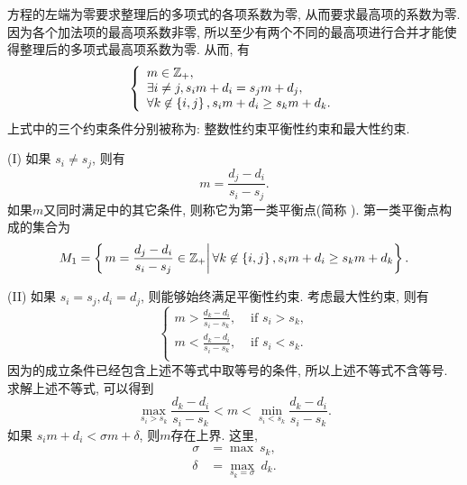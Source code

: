 方程的左端为零要求整理后的多项式的各项系数为零, 从而要求最高项的系数为零. 因为各个加法项的最高项系数非零, 所以至少有两个不同的最高项进行合并才能使得整理后的多项式最高项系数为零. 从而, 有 
\begin{equation}
\left\{
\begin{array}{l}
m\in \mathbb Z_+  ,                                     \\
\exists i\neq j, s_i m+d_i=s_j m+d_j    ,               \\
\forall k \not\in \left\{i,j\right\}, s_i m+d_i\ge s_k m+d_k .
\end{array}
\right.
\label{cond}
\end{equation}
上式中的三个约束条件分别被称为: 整数性约束\D 平衡性约束和最大性约束. 

(I) 如果 $s_i \neq s_j$, 则有 
\begin{equation}
m=\frac{d_j-d_i}{s_i-s_j}.
\end{equation}
如果$m$又同时满足中的其它条件, 则称它为第一类平衡点(简称 \BPone{}). 第一类平衡点构成的集合为 
\begin{equation}
M_1=\left\{\left. m=\frac{d_j-d_i}{s_i-s_j}\in \mathbb Z_+\right\vert \forall k\not\in \left\{i,j\right\}, s_i m+d_i\ge s_k m+d_k\right\}.
\end{equation}

(II) 如果 $s_i = s_j, d_i=d_j$, 则能够始终满足平衡性约束. 考虑最大性约束, 则有 
\begin{equation}
\left\{
\begin{split}
m > \frac{d_k-d_i}{s_i-s_k}, & \text{ if } s_i>s_k,  \\
m < \frac{d_k-d_i}{s_i-s_k}, & \text{ if } s_i<s_k.  \\
\end{split}
\right.
\end{equation}
因为\BPone{}的成立条件已经包含上述不等式中取等号的条件, 所以上述不等式不含等号. 求解上述不等式, 可以得到 
\begin{equation}
\underset{s_i>s_k}{\max}{\frac{d_k-d_i}{s_i-s_k}} < m < \underset{s_i<s_k}{\min}{\frac{d_k-d_i}{s_i-s_k}}.
\end{equation}
如果 $s_i m + d_i < \sigma m + \delta$, 则$m$存在上界. 这里, 
\begin{equation}
\begin{split}
\sigma &= \max ~s_k,  \\
\delta &= \underset{s_k=\sigma}{\max}{~d_k}.
\end{split}
\label{eq-max-sd}
\end{equation}

